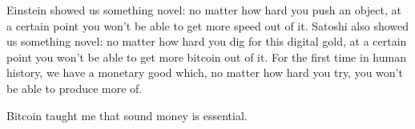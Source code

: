 Einstein showed us something novel: no matter how hard you push an
object, at a certain point you won't be able to get more speed out of
it. Satoshi also showed us something novel: no matter how hard you dig
for this digital gold, at a certain point you won't be able to get more
bitcoin out of it. For the first time in human history, we have a
monetary good which, no matter how hard you try, you won't be able to
produce more of.

Bitcoin taught me that sound money is essential.

%
%
%
%
%
%
%
%
